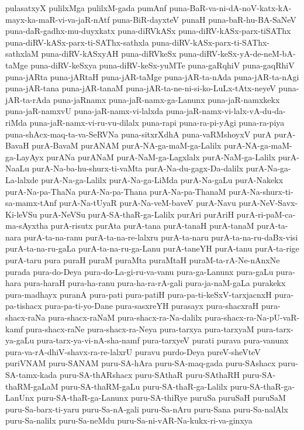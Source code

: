 {pulasatxyX
pulilxMga
pulilxM-gada
pumAnf
puna-BaR-va-ni-dA-noV-katx-kA-mayx-ka-maR-vi-va-jaR-nAtf
puna-BiR-dayxteV
punaH
puna-baR-hu-BA-SaNeV
puna-daR-gadhx-mu-duyxkatx
puna-diRVkASx
puna-diRV-kASx-parx-tiSAThx
puna-diRV-kASx-parx-ti-SAThx-sathxla
puna-diRV-kASx-parx-ti-SAThx-sathxlaM
puna-diRV-kASxyAH
puna-diRVkeSx
puna-diRV-keSx-yA-de-neM-bA-taMge
puna-diRV-keSxya
puna-diRV-keSx-yuMTe
puna-gaRqhiV
puna-gaqRhiV
puna-jARta
puna-jARtaH
puna-jAR-taMge
puna-jAR-ta-nAda
puna-jAR-ta-nAgi
puna-jAR-tana
puna-jAR-tanaM
puna-jAR-ta-ne-ni-si-ko-LuLx-tAtx-neyeV
puna-jAR-ta-rAda
puna-jaRnamx
puna-jaR-namx-ga-Lanunx
puna-jaR-namxkekx
puna-jaR-namxvU
puna-jaR-namx-vi-lalxda
puna-jaR-namx-vi-lalx-vA-du-da-riMda
puna-jaR-namx-vi-ru-vu-dilalx
puna-rapi
puna-ra-pi-yAgi
puna-ra-piya
puna-shAcx-maq-ta-va-SeRVNa
puna-sitxrXdhA
puna-vaRMshoyxV
purA
purA-BavaH
purA-BavaM
purANAM
purA-NA-ga-maM-ga-Lalilx
purA-NA-ga-maM-ga-LayAyx
purANa
purANaM
purA-NaM-ga-Lagxlalx
purA-NaM-ga-Lalilx
purA-NaaLu
purA-Na-ba-hu-shurx-ti-vaMta
purA-Na-du-gagx-Da-dalilx
purA-Na-ga-La-lalxde
purA-Na-ga-Lalilx
purA-Na-ga-LiMda
purA-Na-gaLu
purA-Nakekx
purA-Na-pa-ThaNa
purA-Na-pa-Thana
purA-Na-pa-ThanaM
purA-Na-shurx-ti-sa-mamx-tAnf
purA-Na-tUyaR
purA-Na-veM-baveV
purA-Navu
purA-NeV-Savx-Ki-leVSu
purA-NeVSu
purA-SA-thaR-ga-Lalilx
purAri
purAriH
purA-ri-paM-ca-ma-sAyxtha
purA-risutx
purAta
purA-tana
purA-tanaH
purA-tanaM
purA-ta-nara
purA-ta-na-ranu
purA-ta-na-re-lalxru
purA-ta-naru
purA-ta-na-ru-daBx-visi
purA-ta-na-ru-gaLa
purA-ta-na-ru-ga-Lanu
purA-taneYH
purA-tanu
purA-ta-rige
purA-taru
pura
puraH
puraM
puraMta
puraMtaH
puraM-ta-rA-Ne-nAnxNe
purada
pura-do-Deya
pura-do-La-gi-ru-va-vanu
pura-ga-Lanunx
pura-gaLu
pura-hara
pura-haraH
pura-ha-ranu
pura-ha-ra-rA-gali
pura-ja-naM-gaLa
purakekx
pura-madhayx
puranA
pura-pati
pura-patiH
pura-pa-ti-keSxV-tarxjacnxH
pura-pa-tishacx
pura-pa-ti-yo-Dane
pura-sasxreYH
purasayx
pura-shacxraH
pura-shacx-raNa
pura-shacx-raNaM
pura-shacx-ra-Na-dalilx
pura-shacx-ra-Na-pU-vaR-kamf
pura-shacx-raNe
pura-shacx-ra-Neya
pura-tarxya
pura-tarxyaM
pura-tarx-ya-gaLu
pura-tarx-ya-vi-nA-sha-namf
pura-tarxyeV
purati
purava
pura-vanunx
pura-va-rA-dhiV-shavx-ra-re-lalxrU
puravu
purdo-Deya
pureV-sheVteV
puriVNAM
puru-SANAM
puru-SA-hAra
puru-SA-maq-gada
puru-SAshacx
puru-SA-tamx-kada
puru-SA-thARshacx
puru-SAthaR
puru-SAthaRH
puru-SA-thaRM-gaLaM
puru-SA-thaRM-gaLu
puru-SA-thaR-ga-Lalilx
puru-SA-thaR-ga-LanUnx
puru-SA-thaR-ga-Lanunx
puru-SA-thiRye
puruSa
puruSaH
puruSaM
puru-Sa-barx-ti-yaru
puru-Sa-nA-gali
puru-Sa-nAru
puru-Sana
puru-Sa-nalAlx
puru-Sa-nalilx
puru-Sa-neMdu
puru-Sa-ni-vAR-Na-kukx-ri-va-ginxya
}
